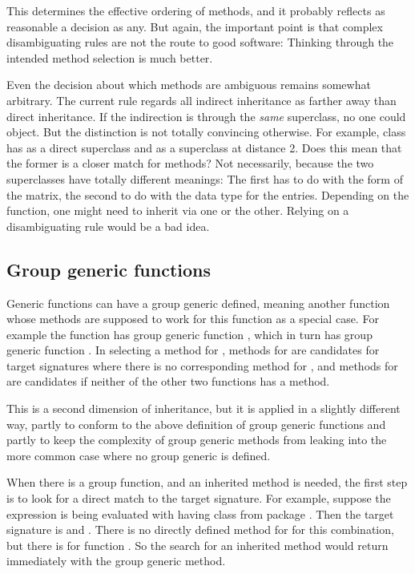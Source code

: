 \documentclass[11pt]{article}
\begin{document}
This determines the effective ordering of methods, and it probably reflects as reasonable a decision as any.
But again, the important point is that complex disambiguating rules are not the route to good software:  Thinking through the intended method selection is much better.

Even the decision about which methods are ambiguous remains somewhat arbitrary.
The current rule regards all indirect inheritance as farther away than direct inheritance.
If the indirection is through the \emph{same}  superclass, no one could object.
But the distinction is not totally convincing otherwise.
For example, class  has  as a direct superclass and  as a superclass at distance 2.
Does this mean that the former is a closer match for methods?
Not necessarily, because the two superclasses have totally different meanings:  The first has to do with the form of the matrix, the second to do with the data type for the entries.
Depending on the function, one might need to inherit via one or the other.
Relying on a disambiguating rule would be a bad idea.

\subsection*{Group generic functions}
\label{sec:group-gener-funct}

Generic functions can have a group generic defined, meaning another function whose methods are supposed to work for this function as a special case.
For example the function \SOperator{+} has group generic function , which in turn has group generic function .
In selecting a method for \SOperator{+}, methods for  are candidates for target signatures where there is no corresponding method for \SOperator{+}, and methods for  are candidates if neither of the other two functions has a method.

This is a second dimension of inheritance, but it is applied in a slightly different way, partly to conform to the above definition of group generic functions and partly to keep the complexity of group generic methods from leaking into the more common case where no group generic is defined.

When there is a group function, and an inherited method is needed, the first step is to look for a direct match to the target signature.
For example, suppose the expression  is being evaluated with  having class  from package .
Then the target signature is  and .
There is no directly defined method for \SOperator{+} for this combination, but there is for function .
So the search for an inherited method would return immediately with the group generic method.
\end{document}
